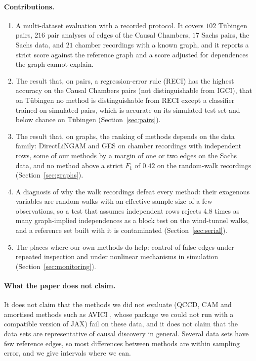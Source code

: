 \paragraph{Contributions.}
\begin{enumerate}
\item A multi-dataset evaluation with a recorded protocol. It covers $102$ Tübingen
  pairs, $216$ pair analyses of edges of the Causal Chambers, $17$ Sachs pairs, the Sachs data, and
  $21$ chamber recordings with a known graph, and it reports a strict score against the
  reference graph and a score adjusted for dependences the graph cannot explain.
\item The result that, on pairs, a regression-error rule (RECI) has the highest accuracy on the Causal
  Chambers pairs (not distinguishable from IGCI), that on Tübingen no method is distinguishable from
  RECI except a classifier trained on simulated pairs, which is accurate on its simulated test set and
  below chance on Tübingen (Section~\ref{sec:pairs}).
\item The result that, on graphs, the ranking of methods depends on the data family: DirectLiNGAM
  and GES on chamber recordings with independent rows, some of our methods by a margin of one or two
  edges on the Sachs data, and no method above a strict $F_1$ of $0.42$ on the random-walk recordings
  (Section~\ref{sec:graphs}).
\item A diagnosis of why the walk recordings defeat every method: their exogenous variables are
  random walks with an effective sample size of a few observations, so a test that assumes
  independent rows rejects $4.8$ times as many graph-implied independences as a block test on the
  wind-tunnel walks, and a reference set built with it is contaminated (Section~\ref{sec:serial}).
\item The places where our own methods do help: control of false edges under repeated
  inspection and under nonlinear mechanisms in simulation (Section~\ref{sec:monitoring}).
\end{enumerate}

\paragraph{What the paper does not claim.} It does not claim that the methods we did not
evaluate (QCCD, CAM and amortised methods such as AVICI \citep{lorch2022amortized}, whose
package we could not run with a compatible version of JAX) fail on these data, and it does not claim that the data
sets are representative of causal discovery in general. Several data sets have few
reference edges, so most differences between methods are within sampling error, and we
give intervals where we can.

